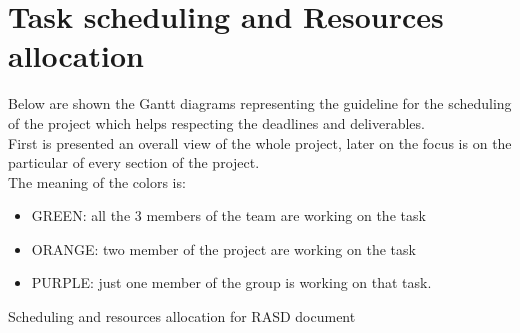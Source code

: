 \documentclass[a4paper,11pt]{report} %
\begin{document}
	\section{Task scheduling and Resources allocation}	
		Below are shown the Gantt diagrams representing the guideline for the scheduling of the project which helps respecting the deadlines and deliverables.\\
		First is presented an overall view of the whole project, later on the focus is on the particular of every section of the project.\\
		The meaning of the colors is:
		\begin{itemize}
			\item GREEN: all the 3 members of the team are working on the task
			\item ORANGE: two member of the project are working on the task
			\item PURPLE: just one member of the group is working on that task.
		\end{itemize}
		\begin{minipage}{\linewidth}
		\end{minipage}			
		\begin{center}
			Scheduling and resources allocation for RASD document
		\end{center}		
		\begin{minipage}{\linewidth}
		\end{minipage}
\end{document}
